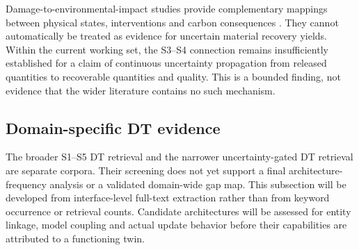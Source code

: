 Damage-to-environmental-impact studies provide complementary mappings between physical states, interventions and carbon consequences \citep{U20,U21}. They cannot automatically be treated as evidence for uncertain material recovery yields. Within the current working set, the S3--S4 connection remains insufficiently established for a claim of continuous uncertainty propagation from released quantities to recoverable quantities and quality. This is a bounded finding, not evidence that the wider literature contains no such mechanism.

\subsection{Domain-specific DT evidence}
The broader S1--S5 DT retrieval and the narrower uncertainty-gated DT retrieval are separate corpora. Their screening does not yet support a final architecture-frequency analysis or a validated domain-wide gap map. This subsection will be developed from interface-level full-text extraction rather than from keyword occurrence or retrieval counts. Candidate architectures will be assessed for entity linkage, model coupling and actual update behavior before their capabilities are attributed to a functioning twin.
